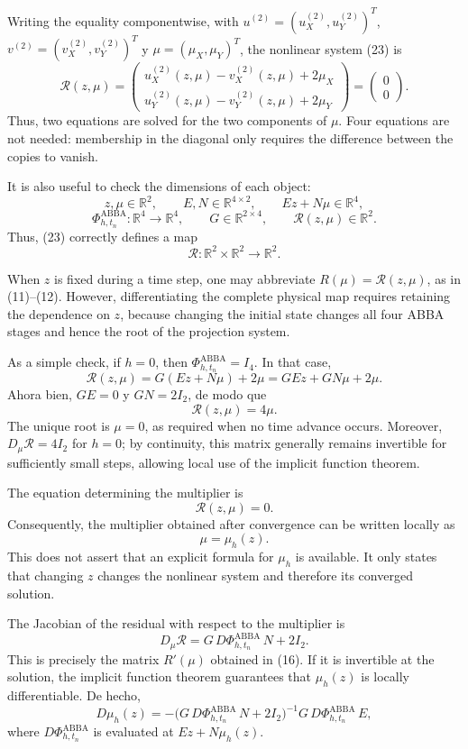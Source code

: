 \documentclass[11pt,a4paper]{article}
\newcommand{\R}{\mathbb{R}}
\newcommand{\Id}{I}
\newcommand{\PhiAB}{\Phi^{\mathrm{ABBA}}_{h,t_n}}
\begin{document}
Writing the equality componentwise, with
$u^{(2)}=(u_X^{(2)},u_Y^{(2)})^T$,
$v^{(2)}=(v_X^{(2)},v_Y^{(2)})^T$ y
$\mu=(\mu_X,\mu_Y)^T$, the nonlinear system (23) is
\[
 \mathcal R(z,\mu)=
 \begin{pmatrix}
  u_X^{(2)}(z,\mu)-v_X^{(2)}(z,\mu)+2\mu_X\\
  u_Y^{(2)}(z,\mu)-v_Y^{(2)}(z,\mu)+2\mu_Y
 \end{pmatrix}
 =\begin{pmatrix}0\\0\end{pmatrix}.
\]
Thus, two equations are solved for the two components of $\mu$. Four equations are not
needed: membership in the diagonal only requires the difference between the copies to vanish.

It is also useful to check the dimensions of each object:
\[
 z,\mu\in\R^2,
 \qquad
 E,N\in\R^{4\times2},
 \qquad
 Ez+N\mu\in\R^4,
\]
\[
 \PhiAB:\R^4\to\R^4,
 \qquad
 G\in\R^{2\times4},
 \qquad
 \mathcal R(z,\mu)\in\R^2.
\]
Thus, (23) correctly defines a map
\[
 \mathcal R:\R^2\times\R^2\longrightarrow\R^2.
\]

When $z$ is fixed during a time step, one may abbreviate
$R(\mu)=\mathcal R(z,\mu)$, as in (11)--(12). However, differentiating the complete
physical map requires retaining the dependence on $z$, because changing the initial state
changes all four ABBA stages and hence the root of the projection system.

As a simple check, if $h=0$, then $\PhiAB=\Id_4$. In that case,
\[
 \mathcal R(z,\mu)
 =G(Ez+N\mu)+2\mu
 =GEz+GN\mu+2\mu.
\]
Ahora bien, $GE=0$ y $GN=2\Id_2$, de modo que
\[
 \mathcal R(z,\mu)=4\mu.
\]
The unique root is $\mu=0$, as required when no time advance occurs. Moreover,
$D_\mu\mathcal R=4\Id_2$ for $h=0$; by continuity, this matrix generally remains
invertible for sufficiently small steps, allowing local use of the implicit function theorem.

The equation determining the multiplier is
\[
 \mathcal R(z,\mu)=0.
\]
Consequently, the multiplier obtained after convergence can be written locally as
\[
 \mu=\mu_h(z).
\]
This does not assert that an explicit formula for $\mu_h$ is available. It only states that
changing $z$ changes the nonlinear system and therefore its converged solution.

The Jacobian of the residual with respect to the multiplier is
\[
 D_\mu\mathcal R
 =G\,D\PhiAB\,N+2\Id_2. \tag{24}
\]
This is precisely the matrix $R'(\mu)$ obtained in (16). If it is invertible at the solution,
the implicit function theorem guarantees that $\mu_h(z)$ is locally differentiable.
De hecho,
\[
 D\mu_h(z)
 =-\bigl(G\,D\PhiAB\,N+2\Id_2\bigr)^{-1}
   G\,D\PhiAB\,E,
\]
where $D\PhiAB$ is evaluated at $Ez+N\mu_h(z)$.
\end{document}
